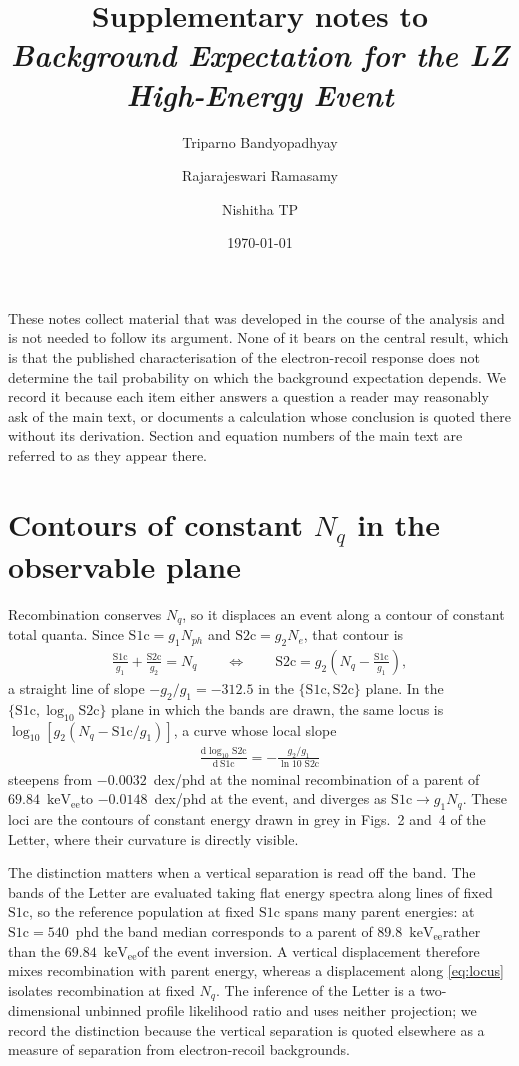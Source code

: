 \documentclass[11pt,a4paper]{article}
\author[1]{Triparno Bandyopadhyay}
\author[2]{Rajarajeswari Ramasamy}
\author[2]{Nishitha TP}
\affil[1]{Nayanta University, Bavdhan, Pune 411021, Maharashtra, India.}
\affil[2]{Department of Physics and Nanotechnology, SRM Institute of
Science and Technology, Kattankulathur, Tamil Nadu 603203, India.}
\title{Supplementary notes to \\
\emph{Background Expectation for the
LZ High-Energy Event}}
\date{\today}
\newcommand{\keVee}{\ensuremath{\mathrm{keV_{ee}}}}
\begin{document}
\maketitle

\noindent
These notes collect material that was developed in the course of the
analysis and is not needed to follow its argument. None of it bears on
the central result, which is that the published characterisation of the
electron-recoil response does not determine the tail probability on which
the background expectation depends. We record it because each item either
answers a question a reader may reasonably ask of the main text, or
documents a calculation whose conclusion is quoted there without its
derivation. Section and equation numbers of the main text are referred to
as they appear there.

\section{Contours of constant \(N_q\) in the observable plane}
\label{sup:geom}

Recombination conserves \(N_q\), so it displaces an event along a contour
of constant total quanta. Since \(\mathrm{S1c}=g_1N_{ph}\) and
\(\mathrm{S2c}=g_2N_e\), that contour is
\begin{align}
    \label{eq:locus}
    \frac{\mathrm{S1c}}{g_1}+\frac{\mathrm{S2c}}{g_2}=N_q
    \qquad\Longleftrightarrow\qquad
    \mathrm{S2c}=g_2\!\left(N_q-\frac{\mathrm{S1c}}{g_1}\right),
\end{align}
a straight line of slope \(-g_2/g_1=-312.5\) in the
\(\{\mathrm{S1c},\mathrm{S2c}\}\) plane. In the
\(\{\mathrm{S1c},\log_{10}\mathrm{S2c}\}\) plane in which the bands are
drawn, the same locus is \(\log_{10}[g_2(N_q-\mathrm{S1c}/g_1)]\), a curve
whose local slope
\begin{align}
    \label{eq:locusslope}
    \frac{\mathrm{d}\log_{10}\mathrm{S2c}}{\mathrm{d}\,\mathrm{S1c}}
    =-\frac{g_2/g_1}{\ln 10\;\mathrm{S2c}}
\end{align}
steepens from \(-0.0032\)~dex/phd at the nominal recombination of a
parent of \(69.84\)~\keVee to \(-0.0148\)~dex/phd at the event, and
diverges as \(\mathrm{S1c}\to g_1N_q\). These loci are the
contours of constant energy drawn in grey in Figs.~2 and~4 of the Letter,
where their curvature is directly visible.

The distinction matters when a vertical separation is read off the band.
The bands of the Letter are evaluated taking flat energy spectra along
lines of fixed \(\mathrm{S1c}\), so the reference population at fixed
\(\mathrm{S1c}\) spans many parent energies: at
\(\mathrm{S1c}=540\)~phd the band median corresponds to a parent of
\(89.8\)~\keVee rather than the \(69.84\)~\keVee of the event
inversion. A vertical displacement therefore mixes recombination with
parent energy, whereas a displacement along \cref{eq:locus} isolates
recombination at fixed \(N_q\). The inference of the Letter is a
two-dimensional unbinned profile likelihood ratio and uses neither
projection; we record the distinction because the vertical separation is
quoted elsewhere as a measure of separation from electron-recoil
backgrounds.
\end{document}
